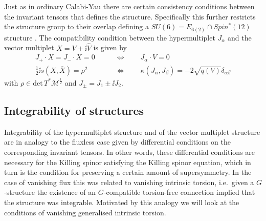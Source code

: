 Just as in ordinary Calabi-Yau there are certain consistency conditions between the invariant tensors that defines the structure. Specifically this further restricts the structure group to their overlap defining a $SU(6)=E_{6(2)}\cap Spin^*(12)$ structure \cite{Grana:2009im}. The compatibility condition between the hypermultiplet $J_\alpha$ and the vector multiplet $X=V+\ii \hat{V}$ is given by 
\begin{equation}\label{eq:CompatibilityVectorHyperStructure}
    \begin{aligned}
        J_+ \cdot X = J_-\cdot X = 0\qquad&\Longleftrightarrow\qquad J_\alpha\cdot V = 0\\
        \frac{1}{2}\ii s(X,\overbar{X}) = \rho^2\qquad &\Longleftrightarrow\qquad \kappa(J_\alpha,J_\beta) = -2\sqrt{q(V)}\delta_{\alpha\beta}
    \end{aligned}
\end{equation}
with $\rho\in\text{det}\, T^*\mathcal{M}^\frac{1}{2}$ and $J_\pm = J_1\pm \ii J_2$. 




\subsection{Integrability of structures}

Integrability of the hypermultiplet structure and of the vector multiplet structure are in analogy to the fluxless case given by differential conditions on the corresponding invariant tensors. In other words, these differential conditions are necessary for the Killing spinor satisfying the Killing spinor equation, which in turn is the condition for preserving a certain amount of supersymmetry. In the case of vanishing flux this was related to vanishing intrinsic torsion, i.e.\ given a $G$-structure the existence of an $G$-compatible torsion-free connection implied that the structure was integrable. Motivated by this analogy we will look at the conditions of vanishing generalised intrinsic torsion.

